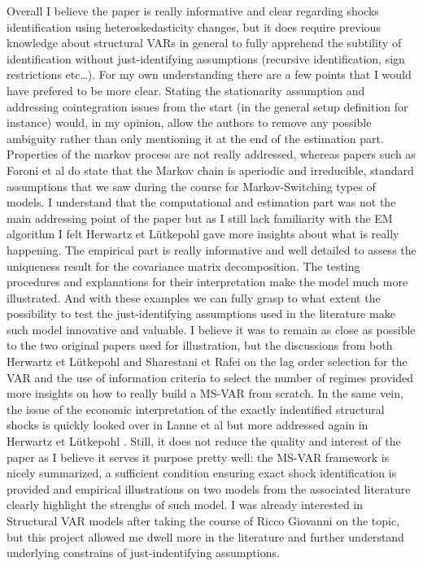 \quad Overall I believe the paper is really informative and clear regarding shocks identification using heteroskedasticity changes, 
but it does require previous knowledge about structural VARs in general to fully apprehend the subtility of identification without just-identifying assumptions (recursive identification, sign restrictions etc\dots).
\bigbreak
For my own understanding there are a few points that I would have prefered to be more clear. 
Stating the stationarity assumption and addressing cointegration issues from the start (in the general setup definition for instance) would, in my opinion, allow the authors to remove any possible ambiguity rather than only mentioning it at the end of the estimation part.
Properties of the markov process are not really addressed, whereas papers such as Foroni et al \cite{Foroni} do state that the Markov chain is aperiodic and irreducible, standard assumptions that we saw during the course for Markov-Switching types of models.
I understand that the computational and estimation part was not the main addressing point of the paper but as I still lack familiarity with the EM algorithm I felt Herwartz et Lütkepohl \cite{HL} gave more insights about what is really happening.
\bigbreak
The empirical part is really informative and well detailed to assess the uniqueness result for the covariance matrix decomposition. 
The testing procedures and explanations for their interpretation make the model much more illustrated. 
And with these examples we can fully grasp to what extent the possibility to test the just-identifying assumptions used in the literature make such model innovative and valuable.
I believe it was to remain as close as possible to the two original papers used for illustration, but the discussions from both Herwartz et Lütkepohl \cite{HL} and Sharestani et Rafei \cite{Iran} on the lag order selection for the VAR and the use of information criteria to select the number of regimes provided more insights on how to really build a MS-VAR from scratch.
In the same vein, the issue of the economic interpretation of the exactly indentified structural shocks is quickly looked over in Lanne et al but more addressed again in Herwartz et Lütkepohl \cite{HL}.
Still, it does not reduce the quality and interest of the paper as I believe it serves it purpose pretty well: the MS-VAR framework is nicely summarized, a sufficient condition ensuring exact shock identification is provided and empirical illustrations on two models from the associated literature clearly highlight the strenghs of such model.
\bigbreak
I was already interested in Structural VAR models after taking the course of Ricco Giovanni on the topic, but this project allowed me dwell more in the literature and further understand underlying constrains of just-indentifying assumptions.